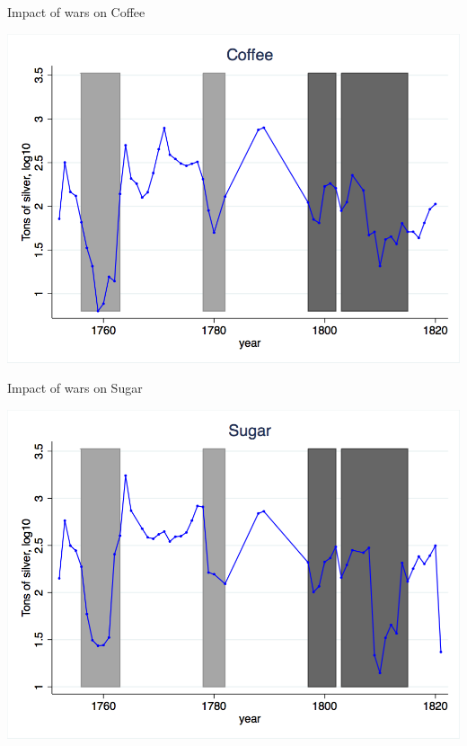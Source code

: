 \documentclass[11pt]{beamer}
\begin{document}
\begin{frame}{Impact of wars on Coffee}
\begin{center}
\includegraphics[scale=.3]{coffee.png}
\end{center}
\end{frame}

\begin{frame}{Impact of wars on Sugar}
\begin{center}
\includegraphics[scale=.3]{sugar.png}
\end{center}
\end{frame}
\end{document}

